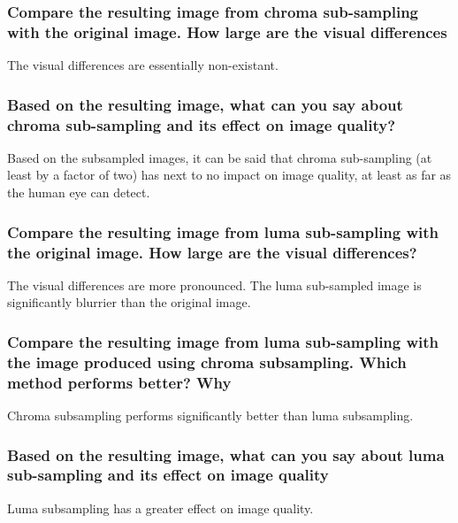 \subsubsection{Compare the resulting image from chroma sub-sampling with the original image. How large are the
visual differences}
The visual differences are essentially non-existant.


\subsubsection{Based on the resulting image, what can you say about chroma sub-sampling and its effect on image
quality?}
Based on the subsampled images, it can be said that chroma sub-sampling (at least by a factor of two) has next to no impact on image quality, at least as far as the human eye can detect.


\subsubsection{Compare the resulting image from luma sub-sampling with the original image. How large are the
visual differences?}
The visual differences are more pronounced. The luma sub-sampled image is significantly blurrier than the original image.


\subsubsection{ Compare the resulting image from luma sub-sampling with the image produced using chroma subsampling. Which method performs better? Why}
Chroma subsampling performs significantly better than luma subsampling. 


\subsubsection{Based on the resulting image, what can you say about luma sub-sampling and its effect on image
quality}
Luma subsampling has a greater effect on image quality.

